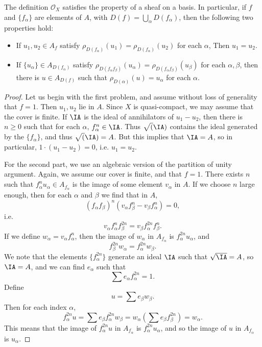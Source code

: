 \begin{lemma}
    The definition $\mathcal{O}_X$ satisfies the property of a sheaf on a basis. In particular, if $f$ and $\{ f_\alpha \}$ are elements of $A$, with $D(f) = \bigcup_\alpha D(f_\alpha)$, then the following two properties hold:
    \begin{itemize}
        \item If $u_1,u_2 \in A_f$ satisfy $\rho_{D(f_\alpha)}(u_1) = \rho_{D(f_\alpha)}(u_2)$ for each $\alpha$, Then $u_1 = u_2$.

        \item If $\{ u_\alpha \} \in A_{D(f_\alpha)}$ satisfy $\rho_{D(f_\alpha f_\beta)}(u_\alpha) = \rho_{D(f_\alpha f_\beta)}(u_\beta)$ for each $\alpha,\beta$, then there is $u \in A_{D(f)}$ such that $\rho_{D(\alpha)}(u) = u_\alpha$ for each $\alpha$.
    \end{itemize}
\end{lemma}
\begin{proof}
    Let us begin with the first problem, and assume without loss of generality that $f = 1$. Then $u_1,u_2$ lie in $A$. Since $X$ is quasi-compact, we may assume that the cover is finite. If $\IA$ is the ideal of annihilators of $u_1 - u_2$, then there is $n \geq 0$ such that for each $\alpha$, $f_\alpha^n \in \IA$. Thus $\sqrt(\IA)$ contains the ideal generated by the $\{ f_\alpha \}$, and thus $\sqrt(\IA) = A$. But this implies that $\IA = A$, so in particular, $1 \cdot (u_1 - u_2) = 0$, i.e. $u_1 = u_2$.

    For the second part, we use an algebraic version of the partition of unity argument. Again, we assume our cover is finite, and that $f = 1$. There exists $n$ such that $f_\alpha^n u_\alpha \in A_{f_\alpha}$ is the image of some element $v_\alpha$ in $A$. If we choose $n$ large enough, then for each $\alpha$ and $\beta$ we find that in $A$,
    \[ (f_\alpha f_\beta)^n (v_\alpha f_\beta^n - v_\beta f_\alpha^n) = 0, \]
    i.e.
    \[ v_\alpha f_\alpha^n f_\beta^{2n} = v_\beta f_\alpha^{2n} f_\beta^n. \]
    If we define $w_\alpha = v_\alpha f_\alpha^n$, then the image of $w_\alpha$ in $A_{f_\alpha}$ is $f_\alpha^{2n} u_\alpha$, and
    \[ f_\beta^{2n} w_\alpha = f_\alpha^{2n} w_\beta. \]
    We note that the elements $\{ f_\alpha^{2n} \}$ generate an ideal $\IA$ such that $\sqrt{\IA} = A$, so $\IA = A$, and we can find $e_\alpha$ such that
    \[ \sum e_\alpha f_\alpha^{2n} = 1. \]
    Define
    \[ u = \sum e_\beta w_\beta. \]
    Then for each index $\alpha$,
    \[ f_\alpha^{2n} u = \sum e_\beta f_\alpha^{2n} w_\beta = w_\alpha (\sum e_\beta f_\beta^{2n}) = w_\alpha. \]
    This means that the image of $f_\alpha^{2n} u$ in $A_{f_\alpha}$ is $f_\alpha^{2n} u_\alpha$, and so the image of $u$ in $A_{f_\alpha}$ is $u_\alpha$.
\end{proof}

